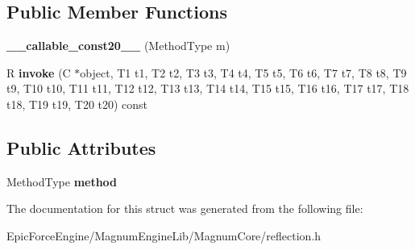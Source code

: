 \subsection*{Public Member Functions}
\begin{DoxyCompactItemize}
\item 
{\bfseries \+\_\+\+\_\+callable\+\_\+const20\+\_\+\+\_\+} (Method\+Type m)\hypertarget{structagm_1_1reflection_1_1____callable__const20_____a34463a57494470891a2c23a44dcf44ba}{}\label{structagm_1_1reflection_1_1____callable__const20_____a34463a57494470891a2c23a44dcf44ba}

\item 
R {\bfseries invoke} (C $\ast$object, T1 t1, T2 t2, T3 t3, T4 t4, T5 t5, T6 t6, T7 t7, T8 t8, T9 t9, T10 t10, T11 t11, T12 t12, T13 t13, T14 t14, T15 t15, T16 t16, T17 t17, T18 t18, T19 t19, T20 t20) const \hypertarget{structagm_1_1reflection_1_1____callable__const20_____a3a0dacc469a4e5ecdc9036032de0625d}{}\label{structagm_1_1reflection_1_1____callable__const20_____a3a0dacc469a4e5ecdc9036032de0625d}

\end{DoxyCompactItemize}
\subsection*{Public Attributes}
\begin{DoxyCompactItemize}
\item 
Method\+Type {\bfseries method}\hypertarget{structagm_1_1reflection_1_1____callable__const20_____a7b4178a8ed983281ac0c008573f75b02}{}\label{structagm_1_1reflection_1_1____callable__const20_____a7b4178a8ed983281ac0c008573f75b02}

\end{DoxyCompactItemize}


The documentation for this struct was generated from the following file\+:\begin{DoxyCompactItemize}
\item 
Epic\+Force\+Engine/\+Magnum\+Engine\+Lib/\+Magnum\+Core/reflection.\+h\end{DoxyCompactItemize}
